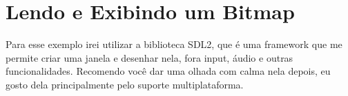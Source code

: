 \documentclass[a4paper,oneside,12pt]{article}
\begin{document}
\section{Lendo e Exibindo um Bitmap}

Para esse exemplo irei utilizar a biblioteca SDL2, que é uma framework que me permite criar uma janela e desenhar nela, fora input, áudio e outras funcionalidades. Recomendo você dar uma olhada com calma nela depois, eu gosto dela principalmente pelo suporte multiplataforma.
\end{document}
